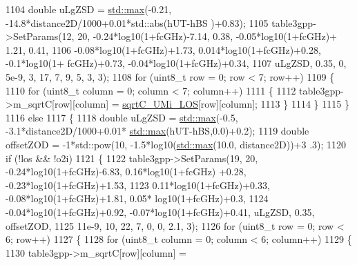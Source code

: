 \begin{DoxyCode}
1104                         \textcolor{keywordtype}{double} uLgZSD = \hyperlink{80211b_8c_affe776513b24d84b39af8ab0930fef7f}{std::max}(-0.21, -14.8*distance2D/1000+0.01*std::abs(hUT-hBS
      )+0.83);
1105                         table3gpp->SetParams(12, 20, -0.24*log10(1+fcGHz)-7.14, 0.38, -0.05*log10(1+fcGHz)+
      1.21, 0.41,
1106                                         -0.08*log10(1+fcGHz)+1.73, 0.014*log10(1+fcGHz)+0.28, -0.1*log10(1+
      fcGHz)+0.73, -0.04*log10(1+fcGHz)+0.34,
1107                                         uLgZSD, 0.35, 0, 5e-9, 3, 17, 7, 9, 5, 3, 3);
1108                         \textcolor{keywordflow}{for} (uint8\_t row = 0; row < 7; row++)
1109                         \{
1110                                 \textcolor{keywordflow}{for} (uint8\_t column = 0; column < 7; column++)
1111                                 \{
1112                                         table3gpp->m\_sqrtC[row][column] = 
      \hyperlink{namespacens3_a34f94bc21850882c7e480c4a8bc5036d}{sqrtC\_UMi\_LOS}[row][column];
1113                                 \}
1114                         \}
1115                 \}
1116                 \textcolor{keywordflow}{else}
1117                 \{
1118                         \textcolor{keywordtype}{double} uLgZSD = \hyperlink{80211b_8c_affe776513b24d84b39af8ab0930fef7f}{std::max}(-0.5, -3.1*distance2D/1000+0.01*
      \hyperlink{80211b_8c_affe776513b24d84b39af8ab0930fef7f}{std::max}(hUT-hBS,0.0)+0.2);
1119                         \textcolor{keywordtype}{double} offsetZOD = -1*std::pow(10, -1.5*log10(\hyperlink{80211b_8c_affe776513b24d84b39af8ab0930fef7f}{std::max}(10.0, distance2D))+3
      .3);
1120                         \textcolor{keywordflow}{if} (!los && !o2i)
1121                         \{
1122                                 table3gpp->SetParams(19, 20, -0.24*log10(1+fcGHz)-6.83, 0.16*log10(1+fcGHz)
      +0.28, -0.23*log10(1+fcGHz)+1.53,
1123                                                 0.11*log10(1+fcGHz)+0.33, -0.08*log10(1+fcGHz)+1.81, 0.05*
      log10(1+fcGHz)+0.3,
1124                                                 -0.04*log10(1+fcGHz)+0.92, -0.07*log10(1+fcGHz)+0.41, 
      uLgZSD, 0.35, offsetZOD,
1125                                                 11e-9, 10, 22, 7, 0, 0, 2.1, 3);
1126                                 \textcolor{keywordflow}{for} (uint8\_t row = 0; row < 6; row++)
1127                                 \{
1128                                         \textcolor{keywordflow}{for} (uint8\_t column = 0; column < 6; column++)
1129                                         \{
1130                                                 table3gpp->m\_sqrtC[row][column] = 

\end{DoxyCode}
